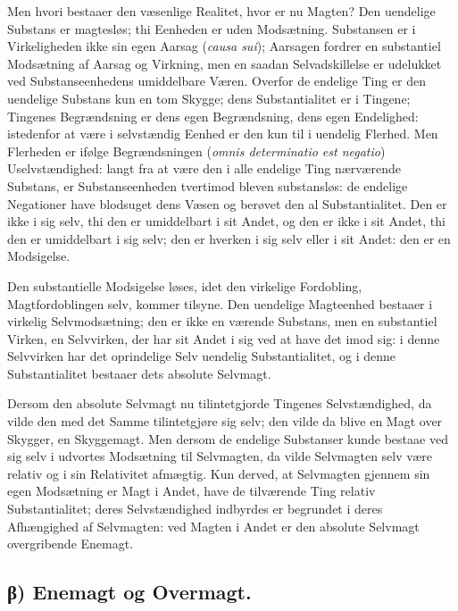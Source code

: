\documentclass[12pt]{book}
\newcommand{\opage}[1]{\marginnote{\footnotesize\textit{[#1]}}}
\begin{document}
Men hvori bestaaer den væsenlige Realitet, hvor er nu
Magten? Den uendelige Substans er magtesløs; thi
Eenheden er uden Modsætning. Substansen er i Virkeligheden
ikke sin egen Aarsag (\textit{causa sui}); Aarsagen fordrer en
substantiel Modsætning af Aarsag og Virkning, men en saadan
Selvadskillelse er udelukket ved Substanseenhedens umiddelbare
Væren. Overfor de endelige Ting er den uendelige
Substans kun en tom Skygge; dens Substantialitet er i
Tingene; Tingenes Begrændsning er dens egen Begrændsning,
dens egen Endelighed: istedenfor at være i selvstændig Eenhed
er den kun til i uendelig Flerhed. Men Flerheden er ifølge
Begrændsningen (\textit{omnis determinatio est negatio})
Uselvstændighed: langt fra at være den i alle endelige Ting
nærværende Substans, er Substanseenheden tvertimod bleven
substansløs: de endelige Negationer have blodsuget dens
Væsen og berøvet den al Substantialitet. Den er ikke i sig
selv, thi den er umiddelbart i sit Andet, og den er ikke i sit
\opage{39} Andet, thi den er umiddelbart i sig selv; den er hverken i sig
selv eller i sit Andet: den er en Modsigelse.

Den substantielle Modsigelse løses, idet den virkelige
Fordobling, Magtfordoblingen selv, kommer tilsyne. Den
uendelige Magteenhed bestaaer i virkelig Selvmodsætning; den
er ikke en værende Substans, men en substantiel Virken, en
Selvvirken, der har sit Andet i sig ved at have det imod sig:
i denne Selvvirken har det oprindelige Selv uendelig
Substantialitet, og i denne Substantialitet bestaaer dets absolute
Selvmagt.

Dersom den absolute Selvmagt nu tilintetgjorde
Tingenes Selvstændighed, da vilde den med det Samme
tilintetgjøre sig selv; den vilde da blive en Magt over Skygger,
en Skyggemagt. Men dersom de endelige Substanser kunde
bestaae ved sig selv i udvortes Modsætning til Selvmagten,
da vilde Selvmagten selv være relativ og i sin Relativitet
afmægtig. Kun derved, at Selvmagten gjennem sin egen
Modsætning er Magt i Andet, have de tilværende Ting relativ
Substantialitet; deres Selvstændighed indbyrdes er
begrundet i deres Afhængighed af Selvmagten: ved Magten
i Andet er den absolute Selvmagt overgribende Enemagt.

\subsection*{β) Enemagt og Overmagt.}
\end{document}
